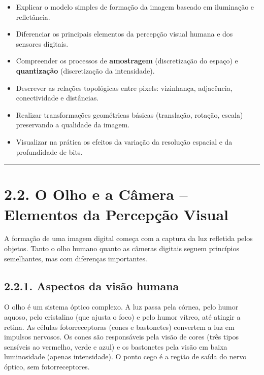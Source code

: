 \documentclass[
  portuguese,
  letterpaper,
  openany,
  oneside,
  12pt,
  a4paper]{book}
\providecommand{\tightlist}{%
  \setlength{\itemsep}{0pt}\setlength{\parskip}{0pt}}
\begin{document}
\begin{tcolorbox}
\begin{itemize}
\tightlist
\item
  Explicar o modelo simples de formação da imagem baseado em iluminação
  e refletância.
\item
  Diferenciar os principais elementos da percepção visual humana e dos
  sensores digitais.
\item
  Compreender os processos de \textbf{amostragem} (discretização do
  espaço) e \textbf{quantização} (discretização da intensidade).
\item
  Descrever as relações topológicas entre pixels: vizinhança,
  adjacência, conectividade e distâncias.
\item
  Realizar transformações geométricas básicas (translação, rotação,
  escala) preservando a qualidade da imagem.
\item
  Visualizar na prática os efeitos da variação da resolução espacial e
  da profundidade de bits.
\end{itemize}

\begin{center}\rule{0.5\linewidth}{0.5pt}\end{center}

\section{2.2. O Olho e a Câmera -- Elementos da Percepção
Visual}\label{o-olho-e-a-cuxe2mera-elementos-da-percepuxe7uxe3o-visual}

A formação de uma imagem digital começa com a captura da luz refletida
pelos objetos. Tanto o olho humano quanto as câmeras digitais seguem
princípios semelhantes, mas com diferenças importantes.

\subsection{2.2.1. Aspectos da visão
humana}\label{aspectos-da-visuxe3o-humana}

O olho é um sistema óptico complexo. A luz passa pela córnea, pelo humor
aquoso, pelo cristalino (que ajusta o foco) e pelo humor vítreo, até
atingir a retina. As células fotorreceptoras (cones e bastonetes)
convertem a luz em impulsos nervosos. Os cones são responsáveis pela
visão de cores (três tipos sensíveis ao vermelho, verde e azul) e os
bastonetes pela visão em baixa luminosidade (apenas intensidade). O
ponto cego é a região de saída do nervo óptico, sem fotorreceptores.


\end{tcolorbox}
\end{document}
